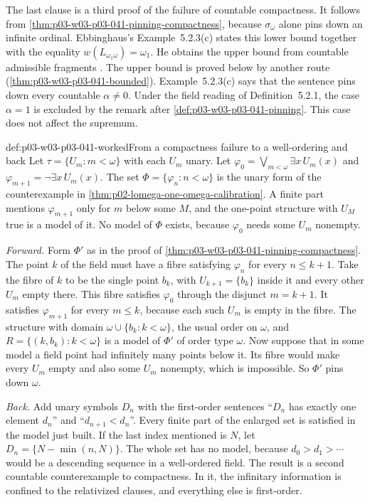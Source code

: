 The last clause is a third proof of the failure of countable compactness.
It follows from \cref{thm:p03-w03-p03-041-pinning-compactness}, because
\(\sigma_\omega\) alone pins down an infinite ordinal. Ebbinghaus's
Example~5.2.3(c) states this lower bound together with the equality
\(w(L_{\omega_1\omega})=\omega_1\). He obtains the upper bound from
countable admissible fragments
\cite[Ch.~II, Example~5.2.3(c), pp.~61--62]{Ebbinghaus1985ExtendedLogics}.
The upper bound is proved below by another route
(\cref{thm:p03-w03-p03-041-bounded}). Example~5.2.3(c) says that
the sentence pins down every countable \(\alpha\neq0\). Under the field
reading of Definition~5.2.1, the case \(\alpha=1\) is excluded by the
remark after \cref{def:p03-w03-p03-041-pinning}. This case does not affect
the supremum.

\begin{hbexample}{def:p03-w03-p03-041-worked}{From a compactness failure to a well-ordering and back}
Let \(\tau=\{U_m:m<\omega\}\) with each \(U_m\) unary. Let
\(\varphi_0=\bigvee_{m<\omega}\exists x\,U_m(x)\) and
\(\varphi_{m+1}=\neg\exists x\,U_m(x)\). The set
\(\Phi=\{\varphi_n:n<\omega\}\) is the unary form of the counterexample in
\cref{thm:p02-lomega-one-omega-calibration}. A finite part mentions
\(\varphi_{m+1}\) only for \(m\) below some \(M\), and the one-point
structure with \(U_M\) true is a model of it. No model of \(\Phi\) exists,
because \(\varphi_0\) needs some \(U_m\) nonempty.

\emph{Forward.} Form \(\Phi'\) as in the proof of
\cref{thm:p03-w03-p03-041-pinning-compactness}. The point \(k\) of the
field must have a fibre satisfying \(\varphi_n\) for every \(n\leq k+1\).
Take the fibre of \(k\) to be the single point \(b_k\), with
\(U_{k+1}=\{b_k\}\) inside it and every other \(U_m\) empty there. This
fibre satisfies \(\varphi_0\) through the disjunct \(m=k+1\). It satisfies
\(\varphi_{m+1}\) for every \(m\leq k\), because each such \(U_m\) is
empty in the fibre. The structure with domain \(\omega\cup\{b_k:k<\omega\}\),
the usual order on \(\omega\), and \(R=\{(k,b_k):k<\omega\}\) is a model
of \(\Phi'\) of order type \(\omega\). Now suppose that in some model a
field point had infinitely many points below it. Its fibre would make every
\(U_m\) empty and also some \(U_m\) nonempty, which is impossible. So
\(\Phi'\) pins down \(\omega\).

\emph{Back.} Add unary symbols \(D_n\) with the first-order sentences
``\(D_n\) has exactly one element \(d_n\)'' and ``\(d_{n+1}<d_n\)''.
Every finite part of the enlarged set is satisfied in the model just built.
If the last index mentioned is \(N\), let \(D_n=\{N-\min(n,N)\}\). The
whole set has no model, because \(d_0>d_1>\cdots\) would be a descending
sequence in a well-ordered field. The result is a second countable
counterexample to compactness. In it, the infinitary information is
confined to the relativized clauses, and everything else is first-order.
\end{hbexample}

